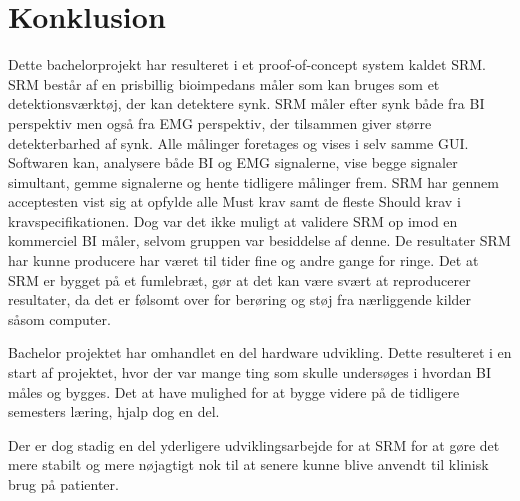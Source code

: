 \chapter{Konklusion}


Dette bachelorprojekt har resulteret i et proof-of-concept system kaldet SRM. SRM består af en prisbillig bioimpedans måler som kan bruges som et detektionsværktøj, der kan detektere synk. SRM måler efter synk både fra BI perspektiv men også fra EMG perspektiv, der tilsammen giver større detekterbarhed af synk. Alle målinger foretages og vises i selv samme GUI. Softwaren kan, analysere både BI og EMG signalerne, vise begge signaler simultant, gemme signalerne og hente tidligere  målinger frem. SRM har gennem acceptesten vist sig at opfylde alle Must krav samt de fleste Should krav i kravspecifikationen. Dog var det ikke muligt at validere SRM op imod en kommerciel BI måler, selvom gruppen var besiddelse af denne. De resultater SRM har kunne producere har været til tider fine og andre gange for ringe. Det at SRM er bygget på et fumlebræt, gør at det kan være svært at reproducerer resultater, da det er følsomt over for berøring og støj fra nærliggende kilder såsom computer. 

Bachelor projektet har omhandlet en del hardware udvikling. Dette resulteret i en start af projektet, hvor der var mange ting som skulle undersøges i hvordan BI måles og bygges. Det at have mulighed for at bygge videre på de tidligere semesters læring, hjalp dog en del.




Der er dog stadig en del yderligere udviklingsarbejde for at SRM for at gøre det mere stabilt og  mere nøjagtigt nok til at senere kunne blive anvendt til klinisk brug på patienter.






